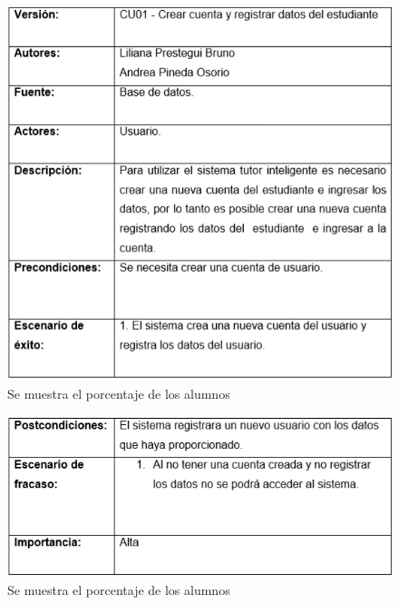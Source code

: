 \documentclass[letterpaper,oneside,openany,11pt]{book}
\begin{document}
\begin{figure}[H]
	\centering
	\includegraphics[width=1.0\textwidth]{./Imagenes/12}
	\caption{Se muestra el porcentaje de los alumnos}
\end{figure}

\begin{figure}[H]
	\centering
	\includegraphics[width=1.0\textwidth]{./Imagenes/13}
	\caption{Se muestra el porcentaje de los alumnos}
\end{figure}
\end{document}
